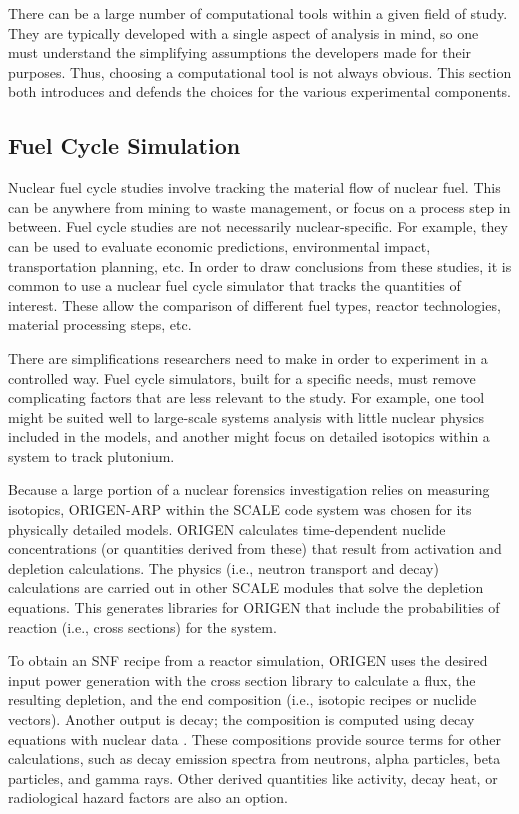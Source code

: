 There can be a large number of computational tools within a given field of
study.  They are typically developed with a single aspect of analysis in mind,
so one must understand the simplifying assumptions the developers made for
their purposes. Thus, choosing a computational tool is not always obvious. This
section both introduces and defends the choices for the various experimental
components.

\subsection{Fuel Cycle Simulation}

Nuclear fuel cycle studies involve tracking the material flow of nuclear fuel.
This can be anywhere from mining to waste management, or focus on a process
step in between. Fuel cycle studies are not necessarily nuclear-specific. For
example, they can be used to evaluate economic predictions, environmental
impact, transportation planning, etc.  In order to draw conclusions from these
studies, it is common to use a nuclear fuel cycle simulator that tracks the
quantities of interest. These allow the comparison of different fuel types,
reactor technologies, material processing steps, etc. 

There are simplifications researchers need to make in order to experiment in a
controlled way. Fuel cycle simulators, built for a specific needs, must remove
complicating factors that are less relevant to the study.  For example, one
tool might be suited well to large-scale systems analysis with little nuclear
physics included in the models, and another might focus on detailed isotopics
within a system to track plutonium.

Because a large portion of a nuclear forensics investigation relies on
measuring isotopics, \gls{ORIGEN-ARP} \cite{origen} within the \gls{SCALE} code
system was chosen for its physically detailed models. \gls{ORIGEN} calculates
time-dependent nuclide concentrations (or quantities derived from these) that
result from activation and depletion calculations. The physics (i.e., neutron
transport and decay) calculations are carried out in other \gls{SCALE} modules that
solve the depletion equations.  This generates libraries for \gls{ORIGEN} that
include the probabilities of reaction (i.e., cross sections) for the system.

To obtain an \gls{SNF} recipe from a reactor simulation, \gls{ORIGEN} uses the
desired input power generation with the cross section library to calculate a
flux, the resulting depletion, and the end composition (i.e., isotopic recipes
or nuclide vectors).  Another output is decay; the composition is computed
using decay equations with nuclear data \cite{endf}. These compositions provide
source terms for other calculations, such as decay emission spectra from
neutrons, alpha particles, beta particles, and gamma rays. Other derived
quantities like activity, decay heat, or radiological hazard factors are also
an option.


